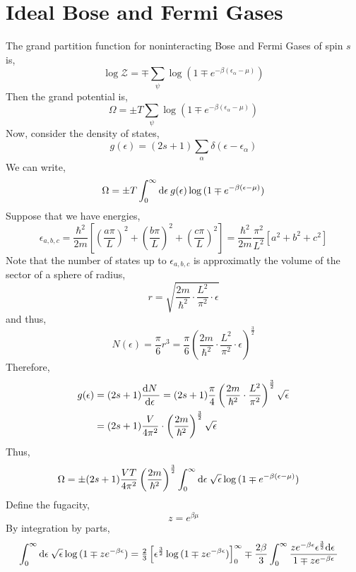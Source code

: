 \documentclass[12pt]{article}
\begin{document}
\section{Ideal Bose and Fermi Gases}

\newcommand{\Grand}{\mathcal{Z}}
\newcommand{\Li}{\mathrm{Li}}

The grand partition function for noninteracting Bose and Fermi Gases of spin $s$ is,
\[ \log{\Grand} = \mp \sum_{\psi} \log{(1 \mp e^{- \beta (\epsilon_\alpha - \mu)})} \]
Then the grand potential is,
\[ \Omega = \pm T  \sum_{\psi} \log{(1 \mp e^{- \beta (\epsilon_\alpha - \mu)})} \]
Now, consider the density of states,
\[ g(\epsilon) = (2s + 1) \sum_{\alpha} \delta(\epsilon - \epsilon_\alpha) \]
We can write,
\[ \Omega = \pm T  \int_0^{\infty} \mathrm{d}\epsilon \: g(\epsilon) \log{(1 \mp e^{- \beta (\epsilon - \mu)})} \]
Suppose that we have energies,
\[ \epsilon_{a,b,c} = \frac{\hbar^2}{2m} \left[ \left( \frac{a \pi}{L} \right)^2 + \left( \frac{b \pi}{L} \right)^2 + \left( \frac{c \pi}{L} \right)^2 \right] = \frac{\hbar^2}{2m} \frac{\pi^2}{L^2} [a^2 + b^2 + c^2] \]
Note that the number of states up to $\epsilon_{a,b,c}$ is approximatly the volume of the sector of a sphere of radius,
\[ r = \sqrt{\frac{2 m}{\hbar^2} \cdot \frac{L^2}{\pi^2} \cdot \epsilon} \]
and thus,
\[ N(\epsilon) = \frac{\pi}{6} r^3 = \frac{\pi}{6} \left( \frac{2 m}{\hbar^2} \cdot \frac{L^2}{\pi^2} \cdot \epsilon \right)^{\frac{3}{2}} \]
Therefore,
\begin{align*}
g(\epsilon) & = (2s + 1) \frac{\mathrm{d}N \:}{\mathrm{d}\epsilon \:} = (2s + 1) \frac{\pi}{4} \left( \frac{2 m}{\hbar^2} \cdot \frac{L^2}{\pi^2} \right)^{\frac{3}{2}} \sqrt{\epsilon} 
\\
& = (2s + 1) \frac{V}{4 \pi^2} \cdot \left( \frac{2 m}{\hbar^2} \right)^{\frac{3}{2}} \sqrt{\epsilon}  
\end{align*}
Thus,
\begin{align*}
\Omega & = \pm (2s + 1) \frac{VT}{4 \pi^2}  \left( \frac{2 m}{\hbar^2} \right)^{\frac{3}{2}} \int_0^{\infty} \mathrm{d}\epsilon \: \sqrt{\epsilon} \log{(1 \mp e^{- \beta (\epsilon - \mu)})}
\end{align*}
Define the fugacity,
\[ z = e^{\beta \mu} \]
By integration by parts,
\begin{align*}
\int_0^{\infty} \mathrm{d}\epsilon \: \sqrt{\epsilon} \log{(1 \mp z e^{- \beta \epsilon})} & = \tfrac{2}{3} \left[ \epsilon^{\frac{3}{2}} \log{(1 \mp z e^{- \beta \epsilon})} \right]^{\infty}_0 \mp \frac{2 \beta}{3} \int_0^{\infty} \frac{ z e^{-\beta \epsilon} \epsilon^{\frac{3}{2}} \mathrm{d}\epsilon \:}{1 \mp z e^{-\beta \epsilon}} 
\end{align*}
\end{document}
